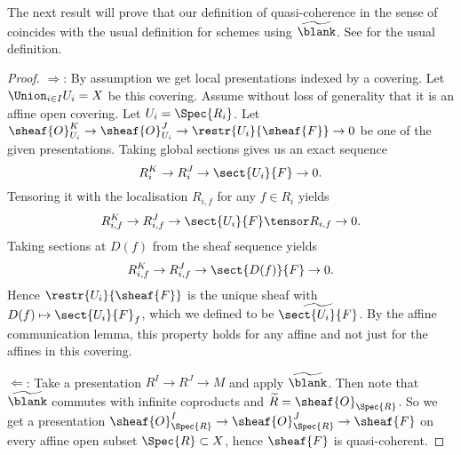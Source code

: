\begin{remark}
The next result will prove that our definition of quasi-coherence in the sense of 
coincides with the usual definition for schemes using $\widetilde{\blank}$.
See \cite[definition 13.2.2]{vakil} for the usual definition.
\end{remark}


\begin{proof}
$\Rightarrow$:
By assumption we get local presentations indexed by a covering.
Let $\Union_{i\in I} U_i = X$ be this covering.
Assume without loss of generality that it is an affine open covering.
Let $U_i = \Spec{R_i}$.
Let $\sheaf{O}_{U_i}^K \rightarrow \sheaf{O}_{U_i}^J \rightarrow \restr{U_i}{\sheaf{F}} \rightarrow 0$
be one of the given presentations.
Taking global sections gives us an exact sequence
\[R_i^K \rightarrow R_i^J \rightarrow \sect{U_i}{F} \rightarrow 0.\]
Tensoring it with the localisation $R_{i,f}$ for any $f\in R_i$ yields
\[R_{i,f}^K \rightarrow R_{i,f}^J \rightarrow \sect{U_i}{F}\tensor R_{i,f} \rightarrow 0.\]
Taking sections at $D(f)$ from the sheaf sequence yields
\[R_{i,f}^K \rightarrow R_{i,f}^J \rightarrow \sect{D(f)}{F} \rightarrow 0.\]
Hence $\restr{U_i}{\sheaf{F}}$ is the unique sheaf with 
$D(f) \mapsto \sect{U_i}{F}_f$,
which we defined to be $\widetilde{\sect{U_i}{F}}$.
By the affine communication lemma, this property holds for any affine and not just for the affines in this covering.

$\Leftarrow$:
Take a presentation $R^I \rightarrow R^J \rightarrow M$
and apply $\widetilde{\blank}$. 
Then note that $\widetilde{\blank}$ commutes with infinite coproducts
and $\widetilde{R} = \sheaf{O}_{\Spec{R}}$.
So we get a presentation 
$\sheaf{O}_{\Spec{R}}^I \rightarrow \sheaf{O}_{\Spec{R}}^J \rightarrow \sheaf{F}$ 
on every affine open subset $\Spec{R}\subset X$, hence $\sheaf{F}$ is quasi-coherent.
\end{proof}
